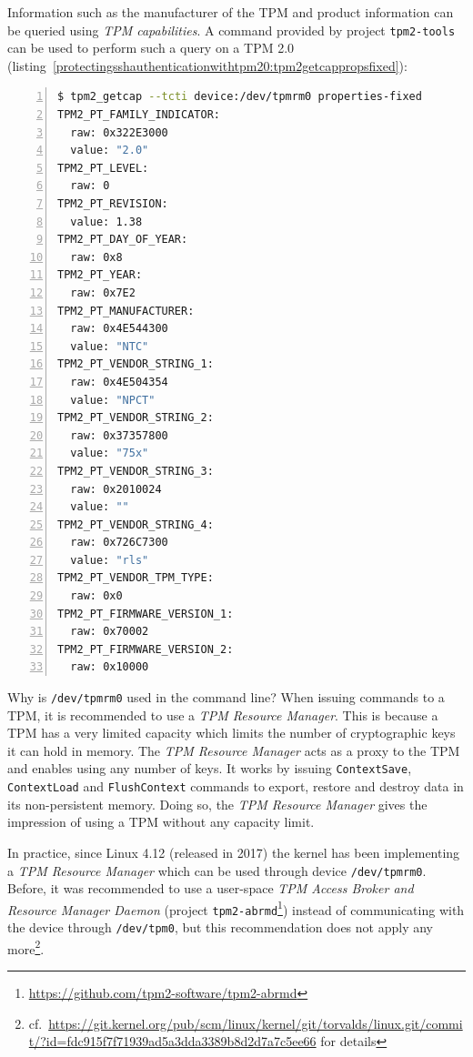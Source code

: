 Information such as the manufacturer of the TPM and product information
can be queried using \emph{TPM capabilities}. A command provided by
project \texttt{tpm2-tools} can be used to perform such
a query on a TPM 2.0
(listing~\ref{protectingsshauthenticationwithtpm20:tpm2getcappropsfixed}):

\begin{lstlisting}[language=sh, numbers=left, caption={Query all fixed properties from a TPM 2.0}, label=protectingsshauthenticationwithtpm20:tpm2getcappropsfixed]
$ tpm2_getcap --tcti device:/dev/tpmrm0 properties-fixed
TPM2_PT_FAMILY_INDICATOR:
  raw: 0x322E3000
  value: "2.0"
TPM2_PT_LEVEL:
  raw: 0
TPM2_PT_REVISION:
  value: 1.38
TPM2_PT_DAY_OF_YEAR:
  raw: 0x8
TPM2_PT_YEAR:
  raw: 0x7E2
TPM2_PT_MANUFACTURER:
  raw: 0x4E544300
  value: "NTC"
TPM2_PT_VENDOR_STRING_1:
  raw: 0x4E504354
  value: "NPCT"
TPM2_PT_VENDOR_STRING_2:
  raw: 0x37357800
  value: "75x"
TPM2_PT_VENDOR_STRING_3:
  raw: 0x2010024
  value: ""
TPM2_PT_VENDOR_STRING_4:
  raw: 0x726C7300
  value: "rls"
TPM2_PT_VENDOR_TPM_TYPE:
  raw: 0x0
TPM2_PT_FIRMWARE_VERSION_1:
  raw: 0x70002
TPM2_PT_FIRMWARE_VERSION_2:
  raw: 0x10000
\end{lstlisting}

Why is \texttt{/dev/tpmrm0} used in the command line?
When issuing commands to a TPM, it is recommended to use a \emph{TPM
Resource Manager}. This is because a TPM has a very limited capacity
which limits the number of cryptographic keys it can hold in memory. The
\emph{TPM Resource Manager} acts as a proxy to the TPM and enables using
any number of keys. It works by issuing
\texttt{ContextSave},
\texttt{ContextLoad} and
\texttt{FlushContext} commands to export, restore and
destroy data in its non-persistent memory. Doing so, the \emph{TPM
Resource Manager} gives the impression of using a TPM without any
capacity limit.

In practice, since Linux 4.12 (released in 2017) the kernel has been
implementing a \emph{TPM Resource Manager} which can be used through
device \texttt{/dev/tpmrm0}. Before, it was recommended
to use a user-space \emph{TPM Access Broker and Resource Manager Daemon}
(project \texttt{tpm2-abrmd}\footnote{\url{https://github.com/tpm2-software/tpm2-abrmd}})
instead of communicating with the device through
\texttt{/dev/tpm0}, but this recommendation does not
apply any more\footnote{cf.~\url{https://git.kernel.org/pub/scm/linux/kernel/git/torvalds/linux.git/commit/?id=fdc915f7f71939ad5a3dda3389b8d2d7a7c5ee66}
  for details}.

